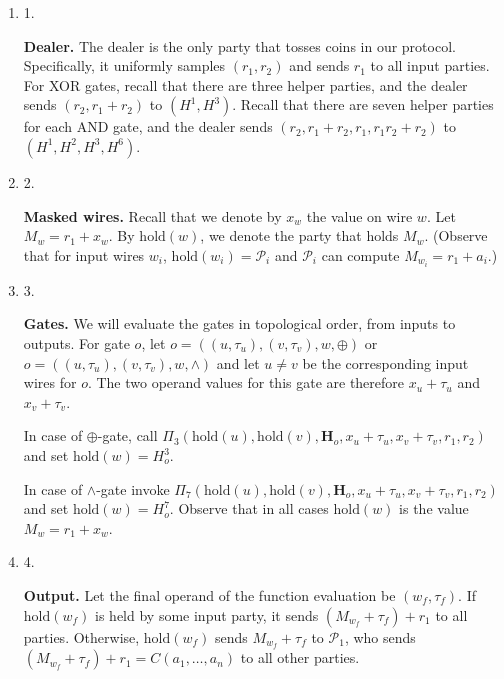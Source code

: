 \begin{enumerate}


\item[] 
1. 


\textbf{Dealer.}
The dealer is the only party that tosses coins in our protocol. Specifically, it uniformly samples $(r_{1},r_{2})$ and sends $r_{1}$ to all
input parties. For XOR gates, recall that there are three helper parties, and the dealer sends
$(r_{2},r_{1}+r_{2})$ to $(H^{1},H^{3})$. Recall that there are seven helper parties for each AND gate, and the dealer sends
$(r_{2},r_{1}+r_{2},r_{1},r_{1}r_{2}+r_{2})$ to $(H^{1},H^{2},H^{3},H^{6})$.\par





\item[] 
2. 


\textbf{Masked wires.}
Recall that we denote by $x_{w}$ the value on wire $w$. Let
$M_{w}=r_{1}+x_{w}$. By $\mathrm{hold}(w)$, we denote the party that holds $M_{w}$.
(Observe that for input wires $w_{i}$,
$\mathrm{hold}(w_{i})=\mathcal{P}_{i}$ and $\mathcal{P}_{i}$ can compute $M_{w_{i}}=r_{1}+a_{i}$.)\par





\item[] 
3. 


\textbf{Gates.}
We will evaluate the gates in topological order, from inputs to outputs. For gate $o$, let
$o=((u,\tau_{u}),(v,\tau_{v}),w,\oplus)$ or
$o=((u,\tau_{u}),(v,\tau_{v}),w,\wedge)$ and let $u\neq v$ be the corresponding input wires for $o$.
The two operand values for this gate are therefore $x_{u}+\tau_{u}$ and $x_{v}+\tau_{v}$.\par




In case of $\oplus$-gate, call
$\Pi_{3}(\mathrm{hold}(u),\mathrm{hold}(v),\mathbf{H}_{o},x_{u}+\tau_{u},x_{v}+\tau_{v},r_{1},r_{2})$ and set
$\mathrm{hold}(w)=H_{o}^{3}$.\par




In case of $\wedge$-gate invoke
$\Pi_{7}(\mathrm{hold}(u),\mathrm{hold}(v),\mathbf{H}_{o},x_{u}+\tau_{u},x_{v}+\tau_{v},r_{1},r_{2})$ and set
$\mathrm{hold}(w)=H_{o}^{7}$.
Observe that in all cases $\mathrm{hold}(w)$ is the value $M_{w}=r_{1}+x_{w}$.\par





\item[] 
4. 


\textbf{Output.}
Let the final operand of the function evaluation be $(w_{f},\tau_{f})$.
If $\mathrm{hold}(w_{f})$ is held by some input party, it sends
$(M_{w_{f}}+\tau_{f})+r_{1}$ to all parties. Otherwise, $\mathrm{hold}(w_{f})$ sends
$M_{w_{f}}+\tau_{f}$ to $\mathcal{P}_{1}$, who sends
$(M_{w_{f}}+\tau_{f})+r_{1}=C(a_{1},\ldots,a_{n})$ to all other parties.\par





\end{enumerate}
